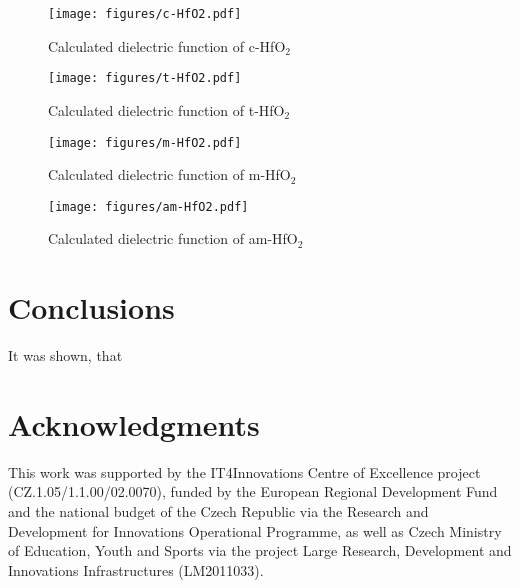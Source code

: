\documentclass[10pt,a4paper,twocolumn]{article}
\begin{document}
\begin{figure}
\begin{center}
	\texttt{[image: figures/c-HfO2.pdf]}
	\caption{Calculated dielectric function of c-HfO$_2$}
   \label{eps-cHfO2}
\end{center}
\end{figure}

\begin{figure}
\begin{center}
	\texttt{[image: figures/t-HfO2.pdf]}
	\caption{Calculated dielectric function of t-HfO$_2$}
   \label{eps-tHfO2}
\end{center}
\end{figure}

\begin{figure}
\begin{center}
	\texttt{[image: figures/m-HfO2.pdf]}
	\caption{Calculated dielectric function of m-HfO$_2$}
   \label{eps-mHfO2}
\end{center}
\end{figure}

\begin{figure}
\begin{center}
	\texttt{[image: figures/am-HfO2.pdf]}
	\caption{Calculated dielectric function of am-HfO$_2$}
   \label{eps-amHfO2}
\end{center}
\end{figure}


\section{Conclusions}

It was shown, that 

\section*{Acknowledgments}
This work was supported by the IT4Innovations Centre of Excellence project (CZ.1.05/1.1.00/02.0070), funded by the European Regional Development Fund and the national budget of the Czech Republic via the Research and Development for Innovations Operational Programme, as well as Czech Ministry of Education, Youth and Sports via the project Large Research, Development and Innovations Infrastructures (LM2011033).



\end{document}
